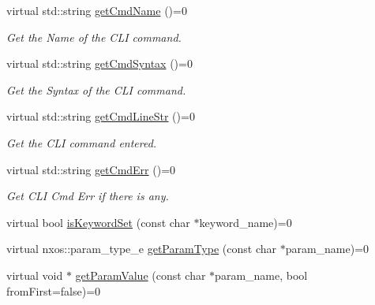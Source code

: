 \begin{DoxyCompactItemize}
\mbox{\label{classnxos_1_1_nx_cli_cmd_acf95739336bb525d749a8e73949cb887}} 
virtual std\+::string \mbox{\hyperlink{classnxos_1_1_nx_cli_cmd_acf95739336bb525d749a8e73949cb887}{get\+Cmd\+Name}} ()=0
\begin{DoxyCompactList}\small\item\em Get the Name of the C\+LI command. \end{DoxyCompactList}\item 
\mbox{\label{classnxos_1_1_nx_cli_cmd_a0568d5404d91ddb89135e632e05d7abe}} 
virtual std\+::string \mbox{\hyperlink{classnxos_1_1_nx_cli_cmd_a0568d5404d91ddb89135e632e05d7abe}{get\+Cmd\+Syntax}} ()=0
\begin{DoxyCompactList}\small\item\em Get the Syntax of the C\+LI command. \end{DoxyCompactList}\item 
\mbox{\label{classnxos_1_1_nx_cli_cmd_a3d856a7d4350f027df53960053901c96}} 
virtual std\+::string \mbox{\hyperlink{classnxos_1_1_nx_cli_cmd_a3d856a7d4350f027df53960053901c96}{get\+Cmd\+Line\+Str}} ()=0
\begin{DoxyCompactList}\small\item\em Get the C\+LI command entered. \end{DoxyCompactList}\item 
\mbox{\label{classnxos_1_1_nx_cli_cmd_aa4321d9b60ecb1366157d0ef9356ffbf}} 
virtual std\+::string \mbox{\hyperlink{classnxos_1_1_nx_cli_cmd_aa4321d9b60ecb1366157d0ef9356ffbf}{get\+Cmd\+Err}} ()=0
\begin{DoxyCompactList}\small\item\em Get C\+LI Cmd Err if there is any. \end{DoxyCompactList}\item 
virtual bool \mbox{\hyperlink{classnxos_1_1_nx_cli_cmd_af100c6495c0e383c8e3d11d5cdb68cd2}{is\+Keyword\+Set}} (const char $\ast$keyword\+\_\+name)=0
\item 
virtual nxos\+::param\+\_\+type\+\_\+e \mbox{\hyperlink{classnxos_1_1_nx_cli_cmd_ab3722b567439f8ebd6422a5727bb7af6}{get\+Param\+Type}} (const char $\ast$param\+\_\+name)=0
\item 
virtual void $\ast$ \mbox{\hyperlink{classnxos_1_1_nx_cli_cmd_a827bd696ec228767cb1f6dbfdbbd271c}{get\+Param\+Value}} (const char $\ast$param\+\_\+name, bool from\+First=false)=0

\end{DoxyCompactItemize}
